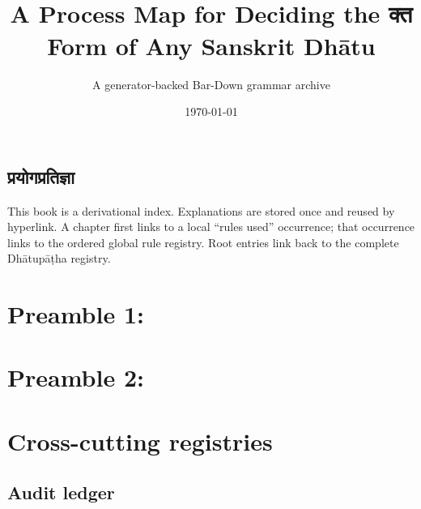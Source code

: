 \documentclass[11pt]{book}
\title{\SA{क्तप्रक्रियामानचित्रम्}\\A Process Map for Deciding the क्त Form of Any Sanskrit Dhātu}
\author{A generator-backed Bar-Down grammar archive}
\date{\today}
\begin{document}
\frontmatter
\maketitle
\tableofcontents

\chapter*{प्रयोगप्रतिज्ञा}
This book is a derivational index. Explanations are stored once and reused by hyperlink. A chapter first links to a local “rules used” occurrence; that occurrence links to the ordered global rule registry. Root entries link back to the complete Dhātupāṭha registry.



\mainmatter
\part{Preamble 1: }


\part{Preamble 2: }


\part{}












\part{Cross-cutting registries}




\backmatter
\chapter{Audit ledger}

\end{document}
